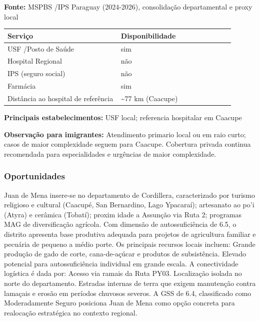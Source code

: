 \textbf{Fonte:} MSPBS /\allowbreak  IPS Paraguay (2024-2026), consolidação
departamental e proxy local

{\def\LTcaptype{none} %
\begin{longtable}{@{}>{\raggedright\arraybackslash}p{0.45\linewidth} >{\raggedright\arraybackslash}p{0.45\linewidth}@{}}
\toprule\noalign{}
Serviço & Disponibilidade \\
\midrule\noalign{}
\endhead
\bottomrule\noalign{}
\endlastfoot
USF /\allowbreak  Posto de Saúde & sim \\
Hospital Regional & não \\
IPS (seguro social) & não \\
Farmácia & sim \\
Distância ao hospital de referência & \textasciitilde77 km (Caacupe) \\
\end{longtable}
}

\textbf{Principais estabelecimentos:} USF local; referencia hospitalar
em Caacupe

\textbf{Observação para imigrantes:} Atendimento primario local ou em
raio curto; casos de maior complexidade seguem para Caacupe. Cobertura
privada continua recomendada para especialidades e urgências de maior
complexidade.
\newpage

\subsubsection*{Oportunidades}\label{oport-juan-de-mena-0310}
Juan de Mena insere-se no departamento de Cordillera, caracterizado por turismo religioso e cultural (Caacupé, San Bernardino, Lago Ypacaraí); artesanato ao po'i (Atyra) e cerâmica (Tobatí); proxim idade a Assunção via Ruta 2; programas MAG de diversificação agrícola. Com dimensão de autossuficiência de 6.5, o distrito apresenta base produtiva adequada para projetos de agricultura familiar e pecuária de pequeno a médio porte. Os principais recursos locais incluem: Grande produção de gado de corte, cana-de-açúcar e produtos de subsistência. Elevado potencial para autossuficiência individual em grande escala. A conectividade logística é dada por: Acesso via ramais da Ruta PY03. Localização isolada no norte do departamento. Estradas internas de terra que exigem manutenção contra lamaçais e erosão em períodos chuvosos severos. A GSS de 6.4, classificado como Moderadamente Seguro posiciona Juan de Mena como opção concreta para realocação estratégica no contexto regional.

